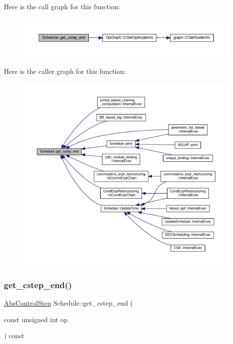 Here is the call graph for this function\+:
\nopagebreak
\begin{figure}[H]
\begin{center}
\leavevmode
\includegraphics[width=350pt]{df/d61/classSchedule_ae37f5691291fd1656e4704c59ded9249_cgraph}
\end{center}
\end{figure}
Here is the caller graph for this function\+:
\nopagebreak
\begin{figure}[H]
\begin{center}
\leavevmode
\includegraphics[width=350pt]{df/d61/classSchedule_ae37f5691291fd1656e4704c59ded9249_icgraph}
\end{center}
\end{figure}
\mbox{\label{classSchedule_aadafc63bf5654bb1fe471923c7f7f763}} 
\subsubsection{\texorpdfstring{get\+\_\+cstep\+\_\+end()}{get\_cstep\_end()}\hspace{0.1cm}{\footnotesize\ttfamily [2/2]}}
{\footnotesize\ttfamily \hyperlink{structAbsControlStep}{Abs\+Control\+Step} Schedule\+::get\+\_\+cstep\+\_\+end (\begin{DoxyParamCaption}\item[{const unsigned int}]{op }\end{DoxyParamCaption}) const}



